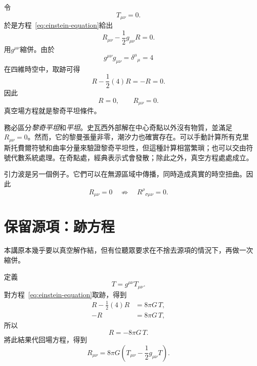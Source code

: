 令
\begin{equation}
 T_{\mu\nu}=0.
\end{equation}
於是方程~\eqref{eq:einstein-equation}給出
\begin{equation}
 R_{\mu\nu}-\frac12g_{\mu\nu}R=0.
 \label{eq:vacuum-einstein}
\end{equation}
用\(g^{\mu\nu}\)縮併。由於
\begin{equation}
 g^{\mu\nu}g_{\mu\nu}
 =\delta^\mu{}_\mu=4
\end{equation}
在四維時空中，取跡可得
\begin{equation}
 R-\frac12(4)R=-R=0.
\end{equation}
因此
\begin{equation}
 R=0,
 \qquad
 R_{\mu\nu}=0.
 \label{eq:ricci-flat}
\end{equation}
真空場方程就是黎奇平坦條件。

務必區分\emph{黎奇平坦}和\emph{平坦}。史瓦西外部解在中心奇點以外沒有物質，並滿足\(R_{\mu\nu}=0\)。然而，它的黎曼張量非零，潮汐力也確實存在。可以手動計算所有克里斯托費爾符號和曲率分量來驗證黎奇平坦性，但這種計算相當繁瑣；也可以交由符號代數系統處理。在奇點處，經典表示式會發散；除此之外，真空方程處處成立。

引力波是另一個例子。它們可以在無源區域中傳播，同時造成真實的時空扭曲。因此
\begin{equation}
 R_{\mu\nu}=0
 \quad\not\Rightarrow\quad
 R^\rho{}_{\sigma\mu\nu}=0.
\end{equation}

\section{保留源項：跡方程}

本講原本幾乎要以真空解作結，但有位聽眾要求在不捨去源項的情況下，再做一次縮併。

\begin{classroomqa}
\end{classroomqa}

定義
\begin{equation}
 T=g^{\mu\nu}T_{\mu\nu}.
\end{equation}
對方程~\eqref{eq:einstein-equation}取跡，得到
\begin{align}
 R-\frac12(4)R&=8\pi G\,T,\\
 -R&=8\pi G\,T,
\end{align}
所以
\begin{equation}
 \boxed{R=-8\pi G\,T}.
 \label{eq:trace-relation}
\end{equation}
將此結果代回場方程，得到
\begin{equation}
 \boxed{
 R_{\mu\nu}
 =
 8\pi G
 \left(
 T_{\mu\nu}-\frac12g_{\mu\nu}T
 \right)
 }.
 \label{eq:ricci-form}
\end{equation}


